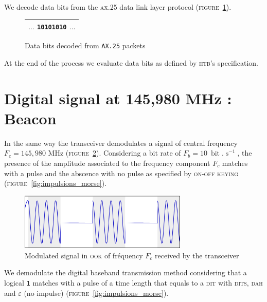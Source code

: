\documentclass[a4paper]{report}
\begin{document}
We decode data bits from the \textsc{ax.25} data link layer protocol (\textsc{figure}~\ref{fig:bits_sans_ax25}).

\begin{figure}[h]
  \begin{center}
  \begin{tabular}{|c|}
    \hline
    $\dots$ \textcolor{rltgreen}{\texttt{10101010}} $\dots$\\
    \hline
  \end{tabular}
  \end{center}
  \caption{Data bits decoded from \texttt{AX.25} packets}
  \label{fig:bits_sans_ax25}
\end{figure}

At the end of the process we evaluate data bits as defined by \textsc{iitb}'s specification\cite{IITB}.

\newpage

\section{Digital signal at 145,980 MHz : Beacon}

In the same way the transceiver demodulates a signal of central frequency $F_c = 145,980$ MHz (\textsc{figure}~\ref{fig:signal_ook}). Considering a bit rate of $F_b = 10 \ \operatorname{bit}.\operatorname{s}^{-1}$, the presence of the amplitude associated to the frequency component $F_c$ matches with a pulse and the abscence with no pulse as specified by \textsc{on-off keying} (\textsc{figure}~\ref{fig:impulsions_morse}).

\begin{figure}[h]
  \begin{center}
  \includegraphics[width=8cm]{pictures/sans_porteuse.png}
  \end{center}
  \caption{Modulated signal in \textsc{ook} of fr\'equency $F_c$ received by the transceiver}
  \label{fig:signal_ook}
\end{figure}

We demodulate the digital baseband transmission method considering that a logical \texttt{1} matches with a pulse of a time length that equals to a \textsc{dit} with \textsc{dits}, \textsc{dah} and $\varepsilon$ (no impulse) (\textsc{figure}~\ref{fig:impulsions_morse}).
\end{document}

